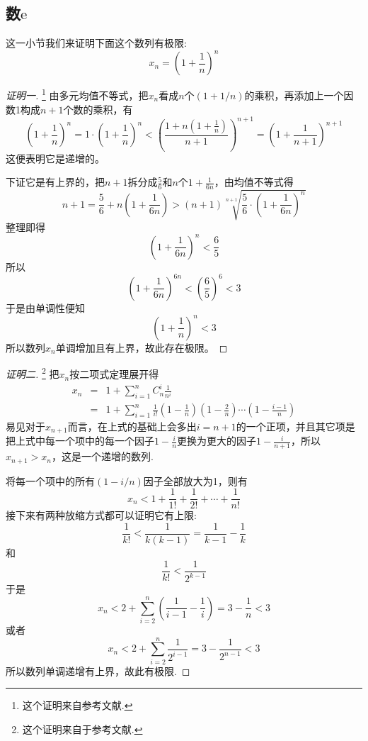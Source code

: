 \subsection{数$\mathrm{e}$}
\label{sec:a-import-sequence-limit}

这一小节我们来证明下面这个数列有极限:
\[ x_n=\left( 1+\frac{1}{n} \right)^n \]

\begin{proof}[证明一]\footnote{这个证明来自参考文献\cite{olympic-math}.}
  由多元均值不等式，把$x_n$看成$n$个$(1+1/n)$的乘积，再添加上一个因数1构成$n+1$个数的乘积，有
  \[ \left( 1+\frac{1}{n} \right)^n = 1 \cdot \left( 1+\frac{1}{n} \right)^n < \left( \frac{1+n\left( 1+\frac{1}{n} \right)}{n+1} \right)^{n+1} = \left( 1+\frac{1}{n+1} \right)^{n+1} \]
  这便表明它是递增的。

  下证它是有上界的，把$n+1$拆分成$\frac{5}{6}$和$n$个$1+\frac{1}{6n}$，由均值不等式得
  \[ n+1 = \frac{5}{6} + n \left( 1+\frac{1}{6n} \right) > (n+1)\sqrt[n+1]{\frac{5}{6} \cdot \left( 1+\frac{1}{6n} \right)^n} \]
  整理即得
  \[ \left( 1+\frac{1}{6n} \right)^n < \frac{6}{5} \]
  所以
  \[ \left( 1+\frac{1}{6n} \right)^{6n} < \left( \frac{6}{5} \right)^6 < 3 \]
  于是由单调性便知
  \[ \left( 1+\frac{1}{n} \right)^n < 3 \]
  所以数列$x_n$单调增加且有上界，故此存在极限。
\end{proof}

\begin{proof}[证明二]\footnote{这个证明来自于参考文献\cite{math-analysis}.}
  把$x_n$按二项式定理展开得
  \begin{eqnarray*}
    x_n & = & 1+\sum_{i=1}^n C_n^i \frac{1}{n^i} \\
    & = & 1+ \sum_{i=1}^n \frac{1}{i!}\left( 1-\frac{1}{n} \right) \left( 1-\frac{2}{n} \right)\cdots \left( 1-\frac{i-1}{n} \right)
  \end{eqnarray*}
  易见对于$x_{n+1}$而言，在上式的基础上会多出$i=n+1$的一个正项，并且其它项是把上式中每一个项中的每一个因子$1-\frac{i}{n}$更换为更大的因子$1-\frac{i}{n+1}$，所以$x_{n+1}>x_n$，这是一个递增的数列.

  将每一个项中的所有$(1-i/n)$因子全部放大为1，则有
  \[  x_n < 1+\frac{1}{1!}+\frac{1}{2!}+\cdots+\frac{1}{n!} \]
  接下来有两种放缩方式都可以证明它有上限:
  \[ \frac{1}{k!} < \frac{1}{k(k-1)} = \frac{1}{k-1} - \frac{1}{k} \]
  和
  \[ \frac{1}{k!} < \frac{1}{2^{k-1}} \]
  于是
  \[ x_n < 2 + \sum_{i=2}^n \left( \frac{1}{i-1}-\frac{1}{i} \right) = 3-\frac{1}{n} < 3 \]
  或者
  \[ x_n < 2 + \sum_{i=2}^n \frac{1}{2^{i-1}} = 3-\frac{1}{2^{n-1}} < 3 \]
  所以数列单调递增有上界，故此有极限.
\end{proof}

